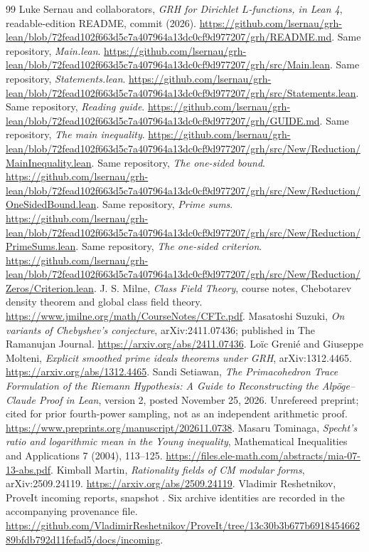\documentclass[11pt,letterpaper]{article}
\theoremstyle{definition}
\theoremstyle{remark}
\begin{document}
\begin{thebibliography}{99}
 Luke Sernau and collaborators,
\emph{GRH for Dirichlet $L$-functions, in Lean 4}, readable-edition README,
commit  (2026).
\url{https://github.com/lsernau/grh-lean/blob/72fead102f663d5c7a407964a13dc0cf9d977207/grh/README.md}.
 Same repository, \emph{Main.lean}.
\url{https://github.com/lsernau/grh-lean/blob/72fead102f663d5c7a407964a13dc0cf9d977207/grh/src/Main.lean}.
 Same repository, \emph{Statements.lean}.
\url{https://github.com/lsernau/grh-lean/blob/72fead102f663d5c7a407964a13dc0cf9d977207/grh/src/Statements.lean}.
 Same repository, \emph{Reading guide}.
\url{https://github.com/lsernau/grh-lean/blob/72fead102f663d5c7a407964a13dc0cf9d977207/grh/GUIDE.md}.
 Same repository, \emph{The main inequality}.
\url{https://github.com/lsernau/grh-lean/blob/72fead102f663d5c7a407964a13dc0cf9d977207/grh/src/New/Reduction/MainInequality.lean}.
 Same repository, \emph{The one-sided bound}.
\url{https://github.com/lsernau/grh-lean/blob/72fead102f663d5c7a407964a13dc0cf9d977207/grh/src/New/Reduction/OneSidedBound.lean}.
 Same repository, \emph{Prime sums}.
\url{https://github.com/lsernau/grh-lean/blob/72fead102f663d5c7a407964a13dc0cf9d977207/grh/src/New/Reduction/PrimeSums.lean}.
 Same repository, \emph{The one-sided criterion}.
\url{https://github.com/lsernau/grh-lean/blob/72fead102f663d5c7a407964a13dc0cf9d977207/grh/src/New/Reduction/Zeros/Criterion.lean}.
 J. S. Milne, \emph{Class Field Theory}, course notes,
Chebotarev density theorem and global class field theory.
\url{https://www.jmilne.org/math/CourseNotes/CFTc.pdf}.
 Masatoshi Suzuki, \emph{On variants of Chebyshev's
conjecture}, arXiv:2411.07436; published in The Ramanujan Journal.
\url{https://arxiv.org/abs/2411.07436}.
 Lo\"ic Greni\'e and Giuseppe Molteni,
\emph{Explicit smoothed prime ideals theorems under GRH},
arXiv:1312.4465.
\url{https://arxiv.org/abs/1312.4465}.
 Sandi Setiawan, \emph{The Primacohedron Trace
Formulation of the Riemann Hypothesis: A Guide to Reconstructing the
Alp\"oge--Claude Proof in Lean}, version 2, posted November 25, 2026.
Unrefereed preprint; cited for prior fourth-power sampling, not as an
independent arithmetic proof.
\url{https://www.preprints.org/manuscript/202611.0738}.
 Masaru Tominaga,
\emph{Specht's ratio and logarithmic mean in the Young inequality},
Mathematical Inequalities and Applications 7 (2004), 113--125.
\url{https://files.ele-math.com/abstracts/mia-07-13-abs.pdf}.
 Kimball Martin, \emph{Rationality fields of CM modular
forms}, arXiv:2509.24119.
\url{https://arxiv.org/abs/2509.24119}.
 Vladimir Reshetnikov, ProveIt incoming reports,
snapshot .
Six archive identities are recorded in the accompanying provenance file.
\url{https://github.com/VladimirReshetnikov/ProveIt/tree/13c30b3b677b691845466289bfdb792d11fefad5/docs/incoming}.
\end{thebibliography}
\end{document}
